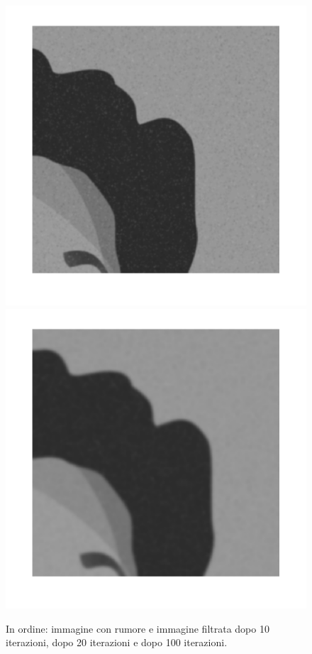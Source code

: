\begin{figure}[htb]
\includegraphics[scale=0.25]{Pictures/Esempi di utilizzo/Esempio 2/raffo_filtrata_n_iter20_dettaglio.png}
\includegraphics[scale=0.25]{Pictures/Esempi di utilizzo/Esempio 2/raffo_filtrata_n_iter100_dettaglio.png}
\caption{In ordine: immagine con rumore e immagine filtrata dopo 10 iterazioni, dopo 20 iterazioni e dopo 100 iterazioni.}\label{fig:figura}
\end{figure} 
